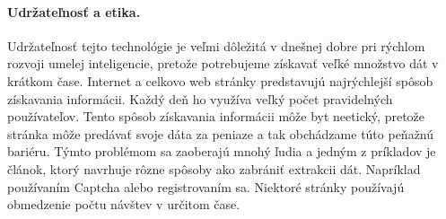 \documentclass[10pt,twoside,slovak,a4paper]{article}
\begin{document}
\paragraph{Udržateľnosť a etika.}
Udržateľnosť tejto technológie je veľmi dôležitá v dnešnej dobre pri rýchlom rozvoji umelej inteligencie, pretože potrebujeme získavať veľké množstvo dát v krátkom čase. Internet a celkovo web stránky predstavujú najrýchlejší spôsob získavania informácii. Každý deň ho využíva veľký počet pravidelných používateľov.
Tento spôsob získavania informácii môže byt neetický, pretože stránka môže predávať svoje dáta za peniaze a tak obchádzame túto peňažnú bariéru. Týmto problémom sa zaoberajú mnohý ľudia a jedným z príkladov je článok\cite{10092327}, ktorý navrhuje rôzne spôsoby ako zabrániť extrakcii dát. Napríklad používaním Captcha alebo registrovaním sa. Niektoré stránky používajú obmedzenie počtu návštev v určitom čase.


\end{document}
